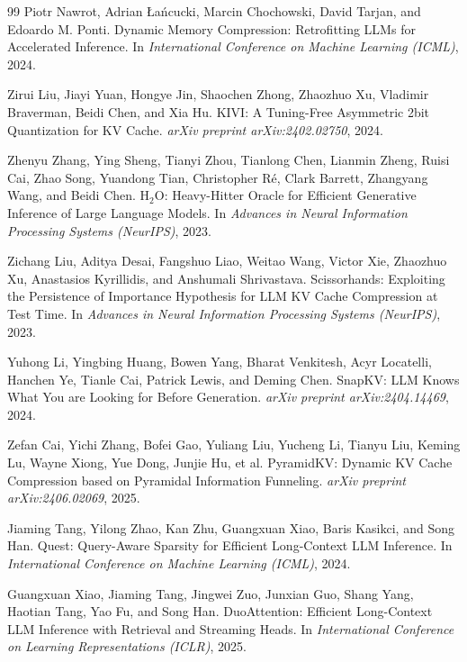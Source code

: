 \documentclass[10pt]{article} %
\begin{document}
\begin{thebibliography}{99}
Piotr Nawrot, Adrian Łańcucki, Marcin Chochowski, David Tarjan, and Edoardo M. Ponti.
\newblock Dynamic Memory Compression: Retrofitting LLMs for Accelerated Inference.
\newblock In \emph{International Conference on Machine Learning (ICML)}, 2024.

Zirui Liu, Jiayi Yuan, Hongye Jin, Shaochen Zhong, Zhaozhuo Xu, Vladimir Braverman, Beidi Chen, and Xia Hu.
\newblock KIVI: A Tuning-Free Asymmetric 2bit Quantization for KV Cache.
\newblock \emph{arXiv preprint arXiv:2402.02750}, 2024.

Zhenyu Zhang, Ying Sheng, Tianyi Zhou, Tianlong Chen, Lianmin Zheng, Ruisi Cai, Zhao Song, Yuandong Tian, Christopher Ré, Clark Barrett, Zhangyang Wang, and Beidi Chen.
\newblock H$_2$O: Heavy-Hitter Oracle for Efficient Generative Inference of Large Language Models.
\newblock In \emph{Advances in Neural Information Processing Systems (NeurIPS)}, 2023.

Zichang Liu, Aditya Desai, Fangshuo Liao, Weitao Wang, Victor Xie, Zhaozhuo Xu, Anastasios Kyrillidis, and Anshumali Shrivastava.
\newblock Scissorhands: Exploiting the Persistence of Importance Hypothesis for LLM KV Cache Compression at Test Time.
\newblock In \emph{Advances in Neural Information Processing Systems (NeurIPS)}, 2023.

Yuhong Li, Yingbing Huang, Bowen Yang, Bharat Venkitesh, Acyr Locatelli, Hanchen Ye, Tianle Cai, Patrick Lewis, and Deming Chen.
\newblock SnapKV: LLM Knows What You are Looking for Before Generation.
\newblock \emph{arXiv preprint arXiv:2404.14469}, 2024.

Zefan Cai, Yichi Zhang, Bofei Gao, Yuliang Liu, Yucheng Li, Tianyu Liu, Keming Lu, Wayne Xiong, Yue Dong, Junjie Hu, et al.
\newblock PyramidKV: Dynamic KV Cache Compression based on Pyramidal Information Funneling.
\newblock \emph{arXiv preprint arXiv:2406.02069}, 2025.

Jiaming Tang, Yilong Zhao, Kan Zhu, Guangxuan Xiao, Baris Kasikci, and Song Han.
\newblock Quest: Query-Aware Sparsity for Efficient Long-Context LLM Inference.
\newblock In \emph{International Conference on Machine Learning (ICML)}, 2024.

Guangxuan Xiao, Jiaming Tang, Jingwei Zuo, Junxian Guo, Shang Yang, Haotian Tang, Yao Fu, and Song Han.
\newblock DuoAttention: Efficient Long-Context LLM Inference with Retrieval and Streaming Heads.
\newblock In \emph{International Conference on Learning Representations (ICLR)}, 2025.


\end{thebibliography}
\end{document}
